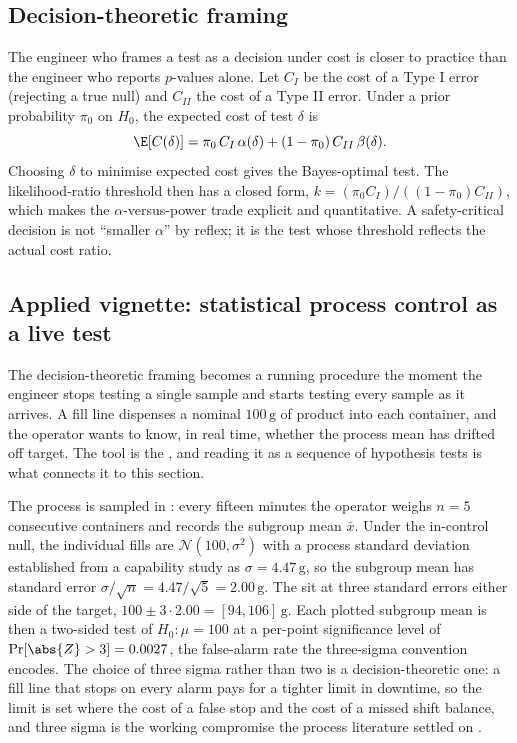 \subsection{Decision-theoretic framing}

The engineer who frames a test as a decision under cost is closer to
practice than the engineer who reports $p$-values alone. Let $C_{I}$
be the cost of a Type I error (rejecting a true null) and $C_{II}$
the cost of a Type II error. Under a prior probability $\pi_{0}$ on
$H_{0}$, the expected cost of test $\delta$ is
\[
\E[C(\delta)] = \pi_{0}\, C_{I}\, \alpha(\delta)
              + (1 - \pi_{0})\, C_{II}\, \beta(\delta).
\]
Choosing $\delta$ to minimise expected cost gives the Bayes-optimal
test. The likelihood-ratio threshold then has a closed form,
$k = (\pi_{0} C_{I})/((1 - \pi_{0}) C_{II})$, which makes the
$\alpha$-versus-power trade explicit and quantitative. A
safety-critical decision is not ``smaller $\alpha$'' by reflex; it
is the test whose threshold reflects the actual cost ratio.

\subsection{Applied vignette: statistical process control as a live test}

The decision-theoretic framing becomes a running procedure the moment
the engineer stops testing a single sample and starts testing every
sample as it arrives. A fill line dispenses a nominal $100\,\si{\gram}$
of product into each container, and the operator wants to know, in real
time, whether the process mean has drifted off target. The tool is the
, and reading it as a sequence of
hypothesis tests is what connects it to this section.

The process is sampled in : every fifteen
minutes the operator weighs $n = 5$ consecutive containers and records
the subgroup mean $\bar{x}$. Under the in-control null, the individual
fills are $\mathcal{N}(100, \sigma^{2})$ with a process standard
deviation established from a capability study as $\sigma = 4.47\,
\si{\gram}$, so the subgroup mean has standard error
$\sigma/\sqrt{n} = 4.47/\sqrt{5} = 2.00\,\si{\gram}$. The
 sit at three standard errors either side of
the target, $100 \pm 3 \cdot 2.00 = [94, 106]\,\si{\gram}$. Each
plotted subgroup mean is then a two-sided test of $H_{0}: \mu = 100$
at a per-point significance level of $\Pr[\abs{Z} > 3] = 0.0027$, the
false-alarm rate the three-sigma convention encodes. The choice of
three sigma rather than two is a decision-theoretic one: a fill line
that stops on every alarm pays for a tighter limit in downtime, so the
limit is set where the cost of a false stop and the cost of a missed
shift balance, and three sigma is the working compromise the process
literature settled on \cite[ch.~4]{text:box-hunter-hunter-2005}.


